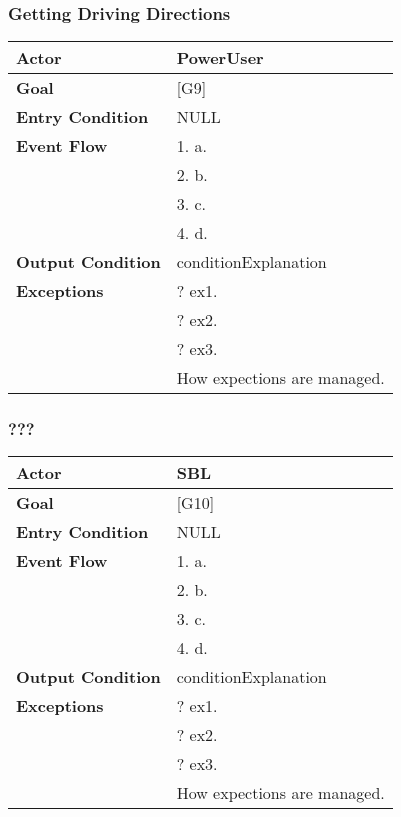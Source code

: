 \subsubsection{Getting Driving Directions}
\begin{tabular}{| l | p{8cm} |}
\hline
\textbf{Actor}      &       PowerUser \\
\hline
\textbf{Goal}       &       [G9]\\
\hline
\textbf{Entry Condition} &  NULL\\
\hline
\textbf{Event Flow}     &   1.	a.\\&
                                            2.	b.\\&
                                            3.	c.\\&
                                            4.  d.\\
\hline
\textbf{Output Condition} & conditionExplanation\\
\hline
\textbf{Exceptions} &       ?   ex1.\\& 
                            ?	ex2.\\&
                            ?	ex3.\\& 
                           How expections are managed.\\
\hline
\end{tabular} 


\subsubsection{???}
\begin{tabular}{| l | p{8cm} |}
\hline
\textbf{Actor}      &       SBL \\
\hline
\textbf{Goal}       &       [G10]\\
\hline
\textbf{Entry Condition} &  NULL\\
\hline
\textbf{Event Flow}     &   1.	a.\\&
                                            2.	b.\\&
                                            3.	c.\\&
                                            4.  d.\\
\hline
\textbf{Output Condition} & conditionExplanation\\
\hline
\textbf{Exceptions} &       ?   ex1.\\& 
                            ?	ex2.\\&
                            ?	ex3.\\& 
                           How expections are managed.\\
\hline
\end{tabular} 


